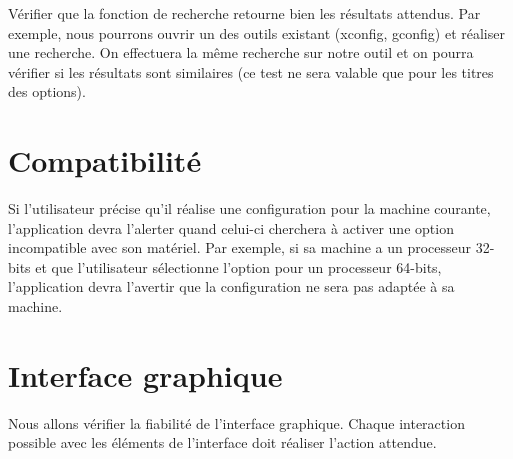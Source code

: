 \documentclass[16pts]{report}
\begin{document}
Vérifier que la fonction de recherche retourne bien les résultats attendus. Par
exemple, nous pourrons ouvrir un des outils existant (xconfig, gconfig) et
réaliser une recherche. On effectuera la même recherche sur notre outil et on
pourra vérifier si les résultats sont similaires (ce test ne sera valable que
pour les titres des options).

\section{Compatibilité}
\label{sec:Compatibilité}

Si l’utilisateur précise qu’il réalise une configuration pour la machine
courante, l’application devra l’alerter quand celui-ci cherchera à activer une
option incompatible avec son matériel. Par exemple, si sa machine a un
processeur 32-bits et que l’utilisateur sélectionne l’option pour un processeur
64-bits, l’application devra l’avertir que la configuration ne sera pas adaptée
à sa machine.

\section{Interface graphique}
\label{sec:Interface graphique}

Nous allons vérifier la fiabilité de l’interface graphique. Chaque interaction
possible avec les éléments de l’interface doit réaliser l’action attendue.
\end{document}

